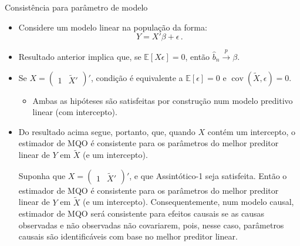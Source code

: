 \documentclass[11pt]{beamer}
\begin{document}
	\begin{frame}{Consistência para parâmetro de modelo}
	\begin{itemize}
		\item Considere um modelo linear na população da forma:
		$$Y = X'\beta + \epsilon\, .$$
		\item Resultado anterior implica que, se $\mathbb{E}[ X\epsilon] = 0$, então $\hat{b}_n \overset{p}{\to} \beta$. 
		\item Se $X = \begin{pmatrix}
			1 & \tilde{X}'
		\end{pmatrix}'$, condição é equivalente a $\mathbb{E}[\epsilon]= 0$ e $\operatorname{cov}(\tilde{X},\epsilon)=0$.
		\begin{itemize}
			\item Ambas as hipóteses são satisfeitas {\color{blue}por construção} num modelo preditivo linear (com intercepto).
		\end{itemize}
		\item Do resultado acima segue, portanto, que, quando $X$ contém um intercepto, o estimador de MQO é consistente para os parâmetros do melhor preditor linear de $Y$ em $\tilde{X}$ (e um intercepto).
		\begin{corollary}
		Suponha que $X = \begin{pmatrix}
			1 & \tilde{X}'
		\end{pmatrix}'$, e que Assintótico-1 seja satisfeita. Então o estimador de MQO é consistente para os parâmetros do melhor preditor linear de $Y$ em $\tilde{X}$ (e um intercepto). Consequentemente, num modelo causal, estimador de MQO será consistente para efeitos causais se as causas observadas e não observadas não covariarem, pois, nesse caso, parâmetros causais são identificáveis com base no melhor preditor linear.
		\end{corollary}
	\end{itemize}
	
	\end{frame}
	
\end{document}
